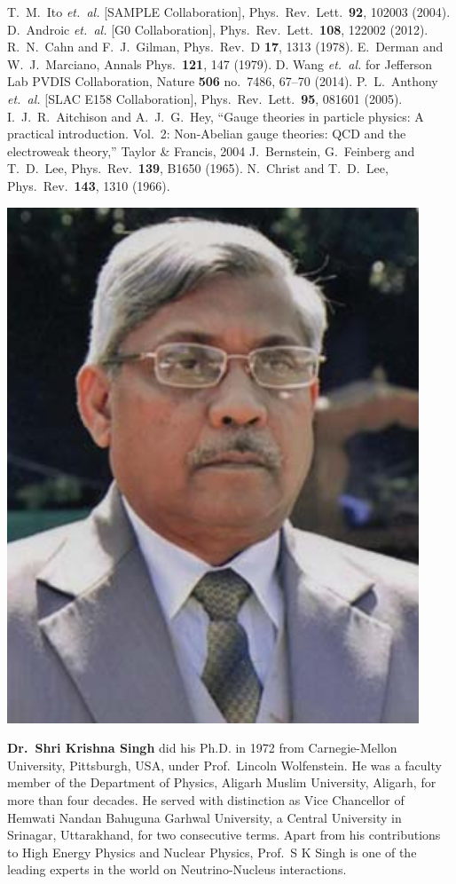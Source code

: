 \begin{thebibliography}{99}
 T.~M.~Ito {\it et.\ al.} [SAMPLE Collaboration], Phys.\ Rev.\ Lett.\  {\bf 92}, 102003 (2004).
 D.~Androic {\it et.\ al.} [G0 Collaboration], Phys.\ Rev.\ Lett.\  {\bf 108}, 122002 (2012).
 R.~N.~Cahn and F.~J.~Gilman, Phys.\ Rev.\ D {\bf 17}, 1313 (1978).
 E.~Derman and W.~J.~Marciano, Annals Phys.\  {\bf 121}, 147 (1979).
 D. Wang {\it et.\ al.} for Jefferson Lab PVDIS Collaboration,   Nature {\bf 506} no.\ 7486, 67--70 (2014). 
 P.~L.~Anthony {\it et.\ al.} [SLAC E158 Collaboration], Phys.\ Rev.\ Lett.\  {\bf 95}, 081601 (2005). 
 I.~J.~R.~Aitchison and A.~J.~G.~Hey, ``Gauge theories in particle physics: A practical introduction. Vol.\ 2: Non-Abelian gauge theories: QCD and the electroweak theory,'' Taylor \& Francis, 2004 
 J.~Bernstein, G.~Feinberg and T.~D.~Lee, Phys.\ Rev.\  {\bf 139}, B1650 (1965).
 N.~Christ and T.~D.~Lee, Phys.\ Rev.\  {\bf 143}, 1310 (1966).
\end{thebibliography}
\vskip 0.5cm
 
\centerline{\includegraphics[scale=.25]{authorsphotos/Prof_S_K_Singh.png}} 
\bigskip   

\noindent
\textbf{Dr.\ Shri Krishna Singh} did his Ph.D. in 1972 from Carnegie-Mellon University, Pittsburgh, USA, under Prof.\ Lincoln Wolfenstein. He was a faculty member of the Department of Physics, Aligarh Muslim University, Aligarh, for more than four decades. He served with distinction as Vice Chancellor of Hemwati Nandan Bahuguna Garhwal University, a Central University in Srinagar, Uttarakhand, for two consecutive terms.
Apart from his contributions to High Energy Physics and Nuclear Physics, Prof.\ S K Singh is one of the leading experts in the world on Neutrino-Nucleus interactions.
